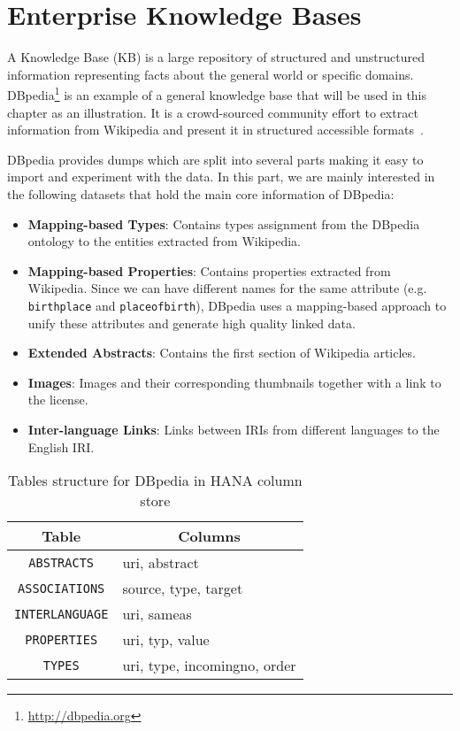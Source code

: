 
\section{Enterprise Knowledge Bases}

A Knowledge Base (KB) is a large repository of structured and unstructured information representing facts about the general world or specific domains. DBpedia\footnote{\url{http://dbpedia.org}} is an example of a general knowledge base that will be used in this chapter as an illustration. It is a crowd-sourced community effort to extract information from Wikipedia and present it in structured accessible formats~\cite{Bizer:WebSemJorunal:09}.

DBpedia provides dumps which are split into several parts making it easy to import and experiment with the data. In this part, we are mainly interested in the following datasets that hold the main core information of DBpedia:

\begin{itemize}
	\item \textbf{Mapping-based Types}: Contains types assignment from the DBpedia ontology to the entities extracted from Wikipedia.
	\item \textbf{Mapping-based Properties}: Contains properties extracted from Wikipedia. Since we can have different names for the same attribute (e.g. \texttt{birthplace} and \texttt{placeofbirth}), DBpedia uses a mapping-based approach to unify these attributes and generate high quality linked data.
	\item \textbf{Extended Abstracts}: Contains the first section of Wikipedia articles.
	\item \textbf{Images}: Images and their corresponding thumbnails together with a link to the license.
	\item \textbf{Inter-language Links}: Links between IRIs from different languages to the English IRI.
\end{itemize}

\begin{table}[hb]
\centering
\begin{tabular}{|c|l|}
\hline
\multicolumn{1}{|c|}{{\bf Table}} & \multicolumn{1}{c|}{{\bf Columns}} \\ \hline
\texttt{ABSTRACTS}                         & uri, abstract                      \\ \hline
\texttt{ASSOCIATIONS}                      & source, type, target               \\ \hline
\texttt{INTERLANGUAGE}                     & uri, sameas                        \\ \hline
\texttt{PROPERTIES}                        & uri, typ, value                    \\ \hline
\texttt{TYPES}                             & uri, type, incomingno, order       \\ \hline
\end{tabular}
\caption{Tables structure for DBpedia in HANA column store}
\label{dbpedia_tables_hana}
\end{table}


